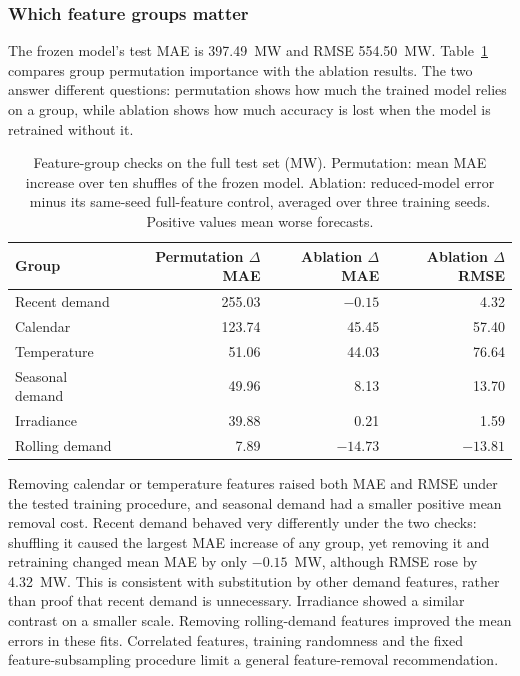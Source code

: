 \documentclass[11pt,a4paper]{article}
\begin{document}
\subsubsection{Which feature groups matter}
The frozen model's test MAE is 397.49~MW and RMSE 554.50~MW. Table~\ref{tab:rq2ablation} compares group permutation importance with the ablation results. The two answer different questions: permutation shows how much the trained model relies on a group, while ablation shows how much accuracy is lost when the model is retrained without it.

\begin{table}[htbp]
\centering\small
\caption{Feature-group checks on the full test set (MW). Permutation: mean MAE increase over ten shuffles of the frozen model. Ablation: reduced-model error minus its same-seed full-feature control, averaged over three training seeds. Positive values mean worse forecasts.}
\label{tab:rq2ablation}
\begin{tabular}{l r r r}
\toprule
Group & Permutation $\Delta$MAE & Ablation $\Delta$MAE & Ablation $\Delta$RMSE \\
\midrule
Recent demand & 255.03 & $-0.15$ & 4.32 \\
Calendar & 123.74 & 45.45 & 57.40 \\
Temperature & 51.06 & 44.03 & 76.64 \\
Seasonal demand & 49.96 & 8.13 & 13.70 \\
Irradiance & 39.88 & 0.21 & 1.59 \\
Rolling demand & 7.89 & $-14.73$ & $-13.81$ \\
\bottomrule
\end{tabular}
\end{table}

Removing calendar or temperature features raised both MAE and RMSE under the tested training procedure, and seasonal demand had a smaller positive mean removal cost. Recent demand behaved very differently under the two checks: shuffling it caused the largest MAE increase of any group, yet removing it and retraining changed mean MAE by only $-0.15$~MW, although RMSE rose by 4.32~MW. This is consistent with substitution by other demand features, rather than proof that recent demand is unnecessary. Irradiance showed a similar contrast on a smaller scale. Removing rolling-demand features improved the mean errors in these fits. Correlated features, training randomness and the fixed feature-subsampling procedure limit a general feature-removal recommendation.
\end{document}

